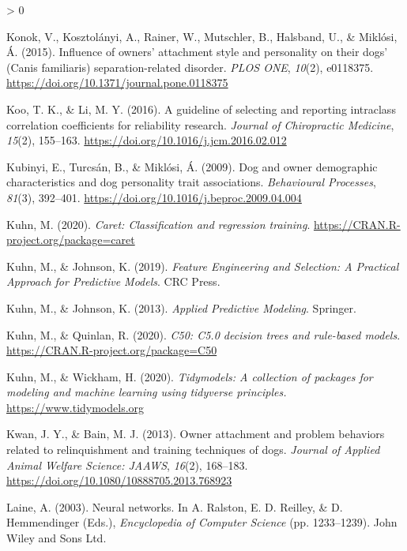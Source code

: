 \documentclass[
  english,
  ,pub,floatsintext]{apa6}
\newlength{\cslhangindent}
\newenvironment{CSLReferences}[2] %
 {%
  \setlength{\parindent}{0pt}
  \ifodd #1 \everypar{\setlength{\hangindent}{\cslhangindent}}\ignorespaces\fi
  \ifnum #2 > 0
  \setlength{\parskip}{#2\baselineskip}
  \fi
 }%
 {}
\begin{document}
\begin{CSLReferences}{1}{0}
\leavevmode\hypertarget{ref-Konok.etal.2015}{}%
Konok, V., Kosztolányi, A., Rainer, W., Mutschler, B., Halsband, U., \& Miklósi, Á. (2015). Influence of owners' attachment style and personality on their dogs' ({Canis} familiaris) separation-related disorder. \emph{PLOS ONE}, \emph{10}(2), e0118375. \url{https://doi.org/10.1371/journal.pone.0118375}

\leavevmode\hypertarget{ref-Koo.Li.2016}{}%
Koo, T. K., \& Li, M. Y. (2016). A guideline of selecting and reporting intraclass correlation coefficients for reliability research. \emph{Journal of Chiropractic Medicine}, \emph{15}(2), 155--163. \url{https://doi.org/10.1016/j.jcm.2016.02.012}

\leavevmode\hypertarget{ref-Kubinyi.etal.2009}{}%
Kubinyi, E., Turcsán, B., \& Miklósi, Á. (2009). Dog and owner demographic characteristics and dog personality trait associations. \emph{Behavioural Processes}, \emph{81}(3), 392--401. \url{https://doi.org/10.1016/j.beproc.2009.04.004}

\leavevmode\hypertarget{ref-R-caret}{}%
Kuhn, M. (2020). \emph{Caret: Classification and regression training}. \url{https://CRAN.R-project.org/package=caret}

\leavevmode\hypertarget{ref-Kuhn.Johnson.2019}{}%
Kuhn, M., \& Johnson, K. (2019). \emph{Feature {Engineering} and {Selection}: {A Practical Approach} for {Predictive Models}}. {CRC Press}.

\leavevmode\hypertarget{ref-Kuhn.Johnson.2013}{}%
Kuhn, M., \& Johnson, K. (2013). \emph{Applied {Predictive Modeling}}. {Springer}.

\leavevmode\hypertarget{ref-R-C50}{}%
Kuhn, M., \& Quinlan, R. (2020). \emph{C50: C5.0 decision trees and rule-based models}. \url{https://CRAN.R-project.org/package=C50}

\leavevmode\hypertarget{ref-R-tidymodels}{}%
Kuhn, M., \& Wickham, H. (2020). \emph{Tidymodels: A collection of packages for modeling and machine learning using tidyverse principles.} \url{https://www.tidymodels.org}

\leavevmode\hypertarget{ref-Kwan.Bain.2013}{}%
Kwan, J. Y., \& Bain, M. J. (2013). Owner attachment and problem behaviors related to relinquishment and training techniques of dogs. \emph{Journal of Applied Animal Welfare Science: JAAWS}, \emph{16}(2), 168--183. \url{https://doi.org/10.1080/10888705.2013.768923}

\leavevmode\hypertarget{ref-Laine.2003}{}%
Laine, A. (2003). Neural networks. In A. Ralston, E. D. Reilley, \& D. Hemmendinger (Eds.), \emph{Encyclopedia of {Computer Science}} (pp. 1233--1239). {John Wiley and Sons Ltd.}


\end{CSLReferences}
\end{document}
